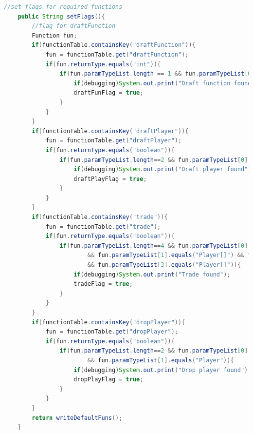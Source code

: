 \documentclass[12pt]{report}
\begin{document}
\begin{singlespace}
\begin{lstlisting}[language=Java,label=some-code,caption={Flood$\_$Sem.java}]
	//set flags for required functions
	public String setFlags(){
		//flag for draftFunction
		Function fun;
		if(functionTable.containsKey("draftFunction")){
			fun = functionTable.get("draftFunction");
			if(fun.returnType.equals("int")){
				if(fun.paramTypeList.length == 1 && fun.paramTypeList[0].equals("int")){
					if(debugging)System.out.print("Draft function found");
					draftFunFlag = true;
				}
			}
		}
		if(functionTable.containsKey("draftPlayer")){
			fun = functionTable.get("draftPlayer");
			if(fun.returnType.equals("boolean")){
				if(fun.paramTypeList.length==2 && fun.paramTypeList[0].equals("User")  && fun.paramTypeList[1].equals("Player")){
					if(debugging)System.out.print("Draft player found");
					draftPlayFlag = true;
				}
			}
		}
		if(functionTable.containsKey("trade")){
			fun = functionTable.get("trade");
			if(fun.returnType.equals("boolean")){
				if(fun.paramTypeList.length==4 && fun.paramTypeList[0].equals("User")
						&& fun.paramTypeList[1].equals("Player[]") && fun.paramTypeList[2].equals("User")
						&& fun.paramTypeList[3].equals("Player[]")){
					if(debugging)System.out.print("Trade found");
					tradeFlag = true;
				}
			}
		}
		if(functionTable.containsKey("dropPlayer")){
			fun = functionTable.get("dropPlayer");
			if(fun.returnType.equals("boolean")){
				if(fun.paramTypeList.length==2 && fun.paramTypeList[0].equals("User")
						&& fun.paramTypeList[1].equals("Player")){
					if(debugging)System.out.print("Drop player found");
					dropPlayFlag = true;
				}
			}
		}
		return writeDefaultFuns();
	}
	

\end{lstlisting}
\end{singlespace}
\end{document}

